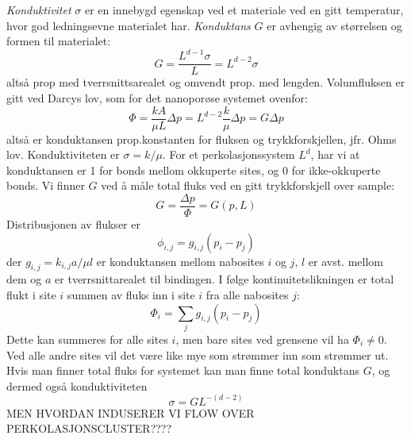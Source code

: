 \documentclass[english, a4paper]{article}
\begin{document}
\noindent
\textit{Konduktivitet} $\sigma$ er en innebygd egenskap ved et materiale ved en gitt temperatur, hvor god 
ledningsevne materialet har. \textit{Konduktans} $G$ er avhengig av størrelsen og formen til materialet:
\begin{equation}
 G = \frac{L^{d-1}\sigma}{L} = L^{d-2}\sigma
\end{equation}
altså prop med tverrsnittsarealet og omvendt prop. med lengden. Volumfluksen er gitt ved Darcys lov, som 
for det nanoporøse systemet ovenfor:
\begin{equation}
 \Phi = \frac{kA}{\mu L}\Delta p = L^{d-2}\frac{k}{\mu}\Delta p = G\Delta p
\end{equation}
altså er konduktansen prop.konstanten for fluksen og trykkforskjellen, jfr. Ohms lov. 
Konduktiviteten er $\sigma = k/\mu$. For et perkolasjonssystem $L^d$, har vi at konduktansen er 1
for bonds mellom okkuperte sites, og 0 for ikke-okkuperte bonds. Vi finner $G$ ved å måle
total fluks ved en gitt trykkforskjell over sample:
\begin{equation}
 G = \frac{\Delta p}{\Phi} = G(p,L)
\end{equation}
Distribusjonen av flukser er
\begin{equation}
 \phi_{i,j} = g_{i,j}(p_i - p_j)
\end{equation}
der $g_{i,j} = k_{i,j}a/\mu l$ er konduktansen mellom nabosites $i$ og $j$, $l$ er avst. mellom dem og 
$a$ er tverrsnittarealet til bindingen. I følge kontinuitetslikningen er total flukt i site $i$ summen
av fluks inn i site $i$ fra alle nabosites $j$:
\begin{equation}
 \Phi_i = \sum_j g_{i,j} (p_i - p_j)
\end{equation}
Dette kan summeres for alle sites $i$, men bare sites ved grensene vil ha $\Phi_i \neq 0$. Ved alle andre
sites vil det være like mye som strømmer inn som strømmer ut. Hvis man finner total fluks for systemet
kan man finne total konduktans $G$, og dermed også konduktiviteten 
\begin{equation}
 \sigma = GL^{-(d-2)}
\end{equation}
MEN HVORDAN INDUSERER VI FLOW OVER PERKOLASJONSCLUSTER????
\end{document}
